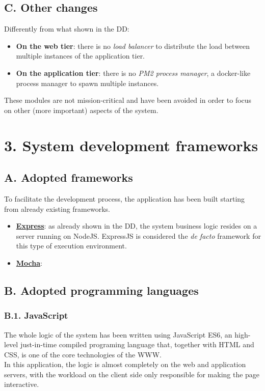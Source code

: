 \section{C. Other changes}

Differently from what shown in the DD:
\begin{itemize}
  \item \textbf{On the web tier}: there is no \emph{load balancer} to distribute the load between multiple instances of the application tier.
  \item \textbf{On the application tier}: there is no \emph{PM2 process manager}, a docker-like process manager to spawn multiple instances.
\end{itemize}
These modules are not mission-critical and have been avoided in order to focus on other (more important) aspects of the system.

\chapter{3. System development frameworks}

\section{A. Adopted frameworks}

To facilitate the development process, the application has been built starting from already existing frameworks.

\begin{itemize}
  \item \textbf{\href{https://www.npmjs.com/package/express}{Express}}: as already shown in the DD, the system business logic resides on a server running on NodeJS.
  ExpressJS is considered the \emph{de facto} framework for this type of execution environment.
  \item \textbf{\href{https://www.npmjs.com/package/mocha}{Mocha}}: %
\end{itemize}

\section{B. Adopted programming languages}

\subsection{B.1. JavaScript}

The whole logic of the system has been written using JavaScript ES6, an high-level just-in-time compiled programing language that, together with HTML and CSS, is one of the core technologies of the WWW.\\
In this application, the logic is almost completely on the web and application servers, with the workload on the client side only responsible for making the page interactive.

